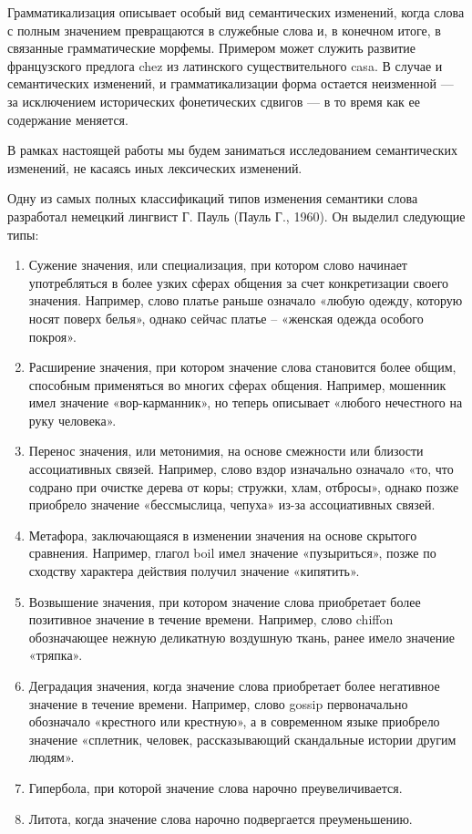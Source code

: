 \documentclass[LI,VKR]{HSEUniversity}
\begin{document}
Грамматикализация описывает особый вид семантических изменений, когда слова с
полным значением превращаются в служебные слова и, в конечном итоге,
в связанные грамматические морфемы.
Примером может служить развитие французского предлога chez из латинского существительного casa.
В случае и семантических изменений, и грамматикализации форма остается неизменной
— за исключением исторических фонетических сдвигов — в то время как ее содержание меняется.

В рамках настоящей работы мы будем заниматься исследованием семантических изменений,
не касаясь иных лексических изменений.

Одну из самых полных классификаций типов изменения семантики слова разработал немецкий
лингвист Г. Пауль (Пауль Г., 1960).
Он выделил следующие типы:

\begin{enumerate}
    \item Сужение значения, или специализация, при котором слово начинает употребляться
в более узких сферах общения за счет конкретизации своего значения.
Например, слово платье раньше означало «любую одежду, которую носят поверх белья»,
однако сейчас платье – «женская одежда особого покроя».
    \item Расширение значения, при котором значение слова становится более общим,
способным применяться во многих сферах общения.
Например, мошенник имел значение «вор-карманник», но теперь описывает
«любого нечестного на руку человека».
    \item Перенос значения, или метонимия, на основе смежности или близости ассоциативных связей.
Например, слово вздор изначально означало «то, что содрано при очистке дерева от коры;
стружки, хлам, отбросы», однако позже приобрело значение «бессмыслица, чепуха»
из-за ассоциативных связей.
    \item Метафора, заключающаяся в изменении значения на основе скрытого сравнения.
Например, глагол boil имел значение «пузыриться», позже по сходству характера действия получил
значение «кипятить».
    \item Возвышение значения,
при котором значение слова приобретает более позитивное значение в течение времени.
Например, слово chiffon обозначающее нежную деликатную воздушную ткань,
ранее имело значение «тряпка».
    \item Деградация значения,
когда значение слова приобретает более негативное значение в течение времени.
Например, слово gossip первоначально обозначало «крестного или крестную», а в современном языке
приобрело значение «сплетник, человек, рассказывающий скандальные истории другим людям».
    \item Гипербола, при которой значение слова нарочно преувеличивается.
    \item Литота, когда значение слова нарочно подвергается преуменьшению.
\end{enumerate}
\end{document}
